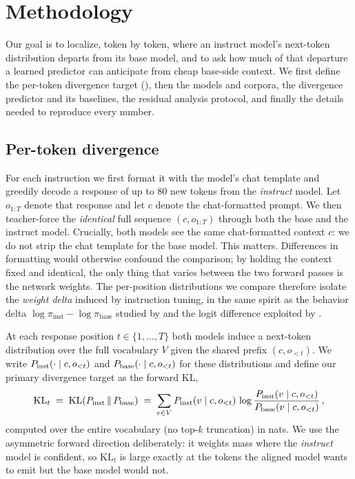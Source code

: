\section{Methodology}\label{sec:method}

Our goal is to localize, token by token, where an instruct model's next-token distribution departs from its base model, and to ask how much of that departure a learned predictor can anticipate from cheap base-side context. We first define the per-token divergence target (), then the models and corpora, the divergence predictor and its baselines, the residual analysis protocol, and finally the details needed to reproduce every number.

\subsection{Per-token divergence}

 For each instruction we first format it with the model's chat template and greedily decode a response of up to $80$ new tokens from the \emph{instruct} model. Let $o_{1:T}$ denote that response and let $c$ denote the chat-formatted prompt. We then teacher-force the \emph{identical} full sequence $(c, o_{1:T})$ through both the base and the instruct model. Crucially, both models see the same chat-formatted context $c$: we do not strip the chat template for the base model. This matters. Differences in formatting would otherwise confound the comparison; by holding the context fixed and identical, the only thing that varies between the two forward passes is the network weights. The per-position distributions we compare therefore isolate the \emph{weight delta} induced by instruction tuning, in the same spirit as the behavior delta $\log\pi_{\mathrm{inst}}-\log\pi_{\mathrm{base}}$ studied by \citet{mitchell2023eft} and the logit difference exploited by \citet{liu2024proxy}.

 At each response position $t\in\{1,\dots,T\}$ both models induce a next-token distribution over the full vocabulary $V$ given the shared prefix $(c,o_{<t})$. We write $P_{\mathrm{inst}}(\cdot\mid c,o_{<t})$ and $P_{\mathrm{base}}(\cdot\mid c,o_{<t})$ for these distributions and define our primary divergence target as the forward KL,
\begin{equation}
\label{eq:kl}
\mathrm{KL}_t \;=\; \mathrm{KL}\!\left(P_{\mathrm{inst}} \,\|\, P_{\mathrm{base}}\right) \;=\; \sum_{v\in V} P_{\mathrm{inst}}(v\mid c,o_{<t})\,\log\frac{P_{\mathrm{inst}}(v\mid c,o_{<t})}{P_{\mathrm{base}}(v\mid c,o_{<t})}\,,
\end{equation}
computed over the entire vocabulary (no top-$k$ truncation) in nats. We use the asymmetric forward direction deliberately: it weights mass where the \emph{instruct} model is confident, so $\mathrm{KL}_t$ is large exactly at the tokens the aligned model wants to emit but the base model would not.

